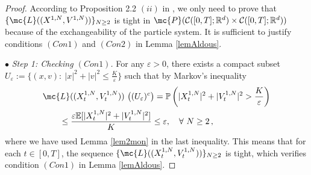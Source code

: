 \documentclass{ims9x6}
\newcommand{\CR}{\mathcal{C}([0,T];\mathbb{R}^d)}
\newcommand{\EE}{\mathbb{E}}
\newcommand{\PP}{\mathbb{P}}
\begin{document}
\begin{proof}
	According to Proposition 2.2 $(ii)$ in \cite[Proposition 2.2 (ii)]{Snitzman}, we only need to prove that $\{\mc{L}((X^{1,N},V^{1,N}))\}_{N\geq 2}$ is tight in $\mc{P}(\CR\times\CR)$ because of the exchangeability of the particle system. It is sufficient to justify conditions $(Con 1)$ and $(Con 2)$ in Lemma \ref{lemAldous}.
	
	$\bullet$ \textit{Step 1: Checking $(Con 1)$. }  
	For any $\varepsilon>0$, there exists a compact subset $U_\varepsilon:=\{(x,v):~|x|^2+|v|^2\leq \frac{K}{\varepsilon}\}$ such that by Markov's inequality
	\begin{align*}
	&\mc{L}((X_t^{1,N},V_t^{1,N}))~\big((U_\varepsilon)^c\big)=\PP\left(|X_t^{1,N}|^2+|V_t^{1,N}|^2> \frac{K}{\varepsilon}\right)\\
	&\qquad \leq \frac{\varepsilon\EE[|X_t^{1,N}|^2+|V_t^{1,N}|^2]}{K}\leq\varepsilon,\quad \forall ~N\geq 2\,,
	\end{align*}
	where we have used Lemma \ref{lem2mon} in the last inequality.
	This means that for each $t\in[0,T]$, the sequence $\{\mc{L}((X_t^{1,N},V_t^{1,N}))\}_{N\geq 2}$ is tight, which verifies  condition $(Con 1)$ in Lemma \ref{lemAldous}.
	

\end{proof}
\end{document}

